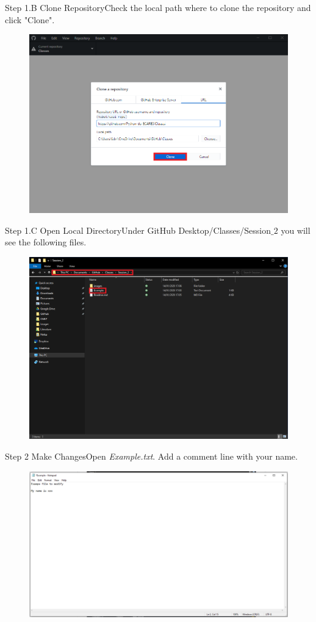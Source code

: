 \documentclass[aspectratio=169]{beamer}
\begin{document}
\begin{frame}{Step 1.B Clone Repository}{Check the local path where to clone the repository and click "Clone".}
	\begin{figure}
		\centering
		\includegraphics[width=0.7\linewidth]{../images/step1.B}
	\end{figure}
\end{frame}

\begin{frame}{Step 1.C Open Local Directory}{Under GitHub Desktop/Classes/Session$\_2$ you will see the following files.}
	\begin{figure}
		\centering
		\includegraphics[width=0.7\linewidth]{../images/step1.C}
	\end{figure}
\end{frame}

\begin{frame}{Step 2 Make Changes}{Open \emph{Example.txt}. Add a comment line with your name.}
	\begin{figure}
		\centering
		\includegraphics[width=0.8\linewidth]{../images/step2}
	\end{figure}
\end{frame}
\end{document}
